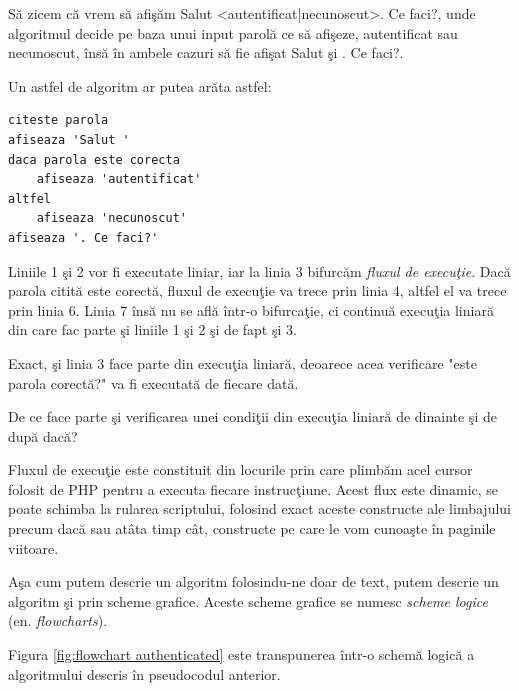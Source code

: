 Să zicem că vrem să afişăm {\glqq}Salut <autentificat|necunoscut>. Ce faci?{\grqq},
unde algoritmul decide pe baza unui input {\glqq}parolă{\grqq} ce să afişeze, {\glqq}autentificat{\grqq}
sau {\glqq}necunoscut{\grqq}, însă în ambele cazuri să fie afişat {\glqq}Salut {\grqq} şi {\glqq}. Ce faci?{\grqq}.

Un astfel de algoritm ar putea arăta astfel:
\begin{lstlisting}[language=pseudocod]
citeste parola
afiseaza 'Salut '
daca parola este corecta
	afiseaza 'autentificat'
altfel
	afiseaza 'necunoscut'
afiseaza '. Ce faci?'
\end{lstlisting}

Liniile 1 şi 2 vor fi executate liniar, iar la linia 3 bifurcăm \textsl{fluxul de execuţie}.
Dacă parola citită este corectă, fluxul de execuţie va trece prin linia 4, altfel
el va trece prin linia 6. Linia 7 însă nu se află într-o bifurcaţie, ci continuă
execuţia liniară din care fac parte şi liniile 1 şi 2 şi de fapt şi 3.

Exact, şi linia 3 face parte din execuţia liniară, deoarece acea verificare "este
parola corectă?" va fi executată de fiecare dată.

\begin{Exercise}[title={Execuţia liniară conţine şi verificarea condiţiei},difficulty=1]
De ce face parte şi verificarea unei condiţii din execuţia liniară de dinainte şi de după
{\glqq}dacă{\grqq}?
\end{Exercise}


Fluxul de execuţie este constituit din {\glqq}locurile{\grqq} prin care plimbăm
acel {\glqq}cursor{\grqq} folosit de PHP pentru a executa fiecare instrucţiune.
Acest flux este dinamic, se poate schimba la rularea scriptului,
folosind exact aceste constructe ale limbajului precum {\glqq}dacă{\grqq} sau {\glqq}atâta timp cât{\grqq},
constructe pe care le vom cunoaşte în paginile viitoare.

Aşa cum putem descrie un algoritm folosindu-ne doar de text, putem
descrie un algoritm şi prin scheme grafice. Aceste scheme grafice se numesc
\textit{scheme logice} (en. \textsl{flowcharts}).

Figura \ref{fig:flowchart authenticated} este transpunerea
într-o schemă logică a algoritmului descris în pseudocodul anterior.

